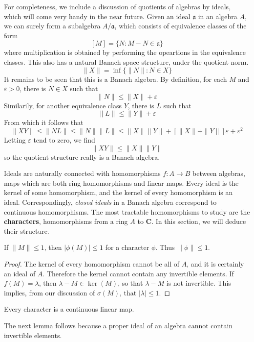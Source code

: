For completeness, we include a discussion of quotients of algebras by ideals, which will come very handy in the near future. Given an ideal $\mathfrak{a}$ in an algebra $A$, we can surely form a subalgebra $A/\mathfrak{a}$, which consists of equivalence classes of the form
%
\[ [M] = \{ N : M - N \in \mathfrak{a} \} \]
%
where multiplication is obtained by performing the opeartions in the equivalence classes. This also has a natural Banach space structure, under the quotient norm.
%
\[ \| X \| = \inf \{ \| N \| : N \in X \} \]
%
It remains to be seen that this is a Banach algebra. By definition, for each $M$ and $\varepsilon > 0$, there is $N \in X$ such that
%
\[ \| N \| \leq \| X \| + \varepsilon \]
%
Similarily, for another equivalence class $Y$, there is $L$ such that
%
\[ \| L \| \leq \| Y \| + \varepsilon \]
%
From which it follows that
%
\[ \| XY \| \leq \| NL \| \leq \| N \| \| L \| \leq \| X \| \| Y \| + [\| X \| + \| Y \|] \varepsilon + \varepsilon^2 \]
%
Letting $\varepsilon$ tend to zero, we find
%
\[ \| XY \| \leq \| X \| \| Y \| \]
%
so the quotient structure really is a Banach algebra.

Ideals are naturally connected with homomorphisms $f: A \to B$ between algebras, maps which are both ring homomorphisms and linear maps. Every ideal is the kernel of some homomorphism, and the kernel of every homomorphism is an ideal. Correspondingly, {\it closed ideals} in a Banach algebra correspond to continuous homomorphisms. The most tractable homomorphisms to study are the {\bf characters}, homomorphisms from a ring $A$ to $\mathbf{C}$. In this section, we will deduce their structure.

\begin{lemma}
    If $\| M \| \leq 1$, then $|\phi(M)| \leq 1$ for a character $\phi$. Thus $\| \phi \| \leq 1$.
\end{lemma}
\begin{proof}
    The kernel of every homomorphism cannot be all of $A$, and it is certainly an ideal of $A$. Therefore the kernel cannot contain any invertible elements. If $f(M) = \lambda$, then $\lambda - M \in \ker(M)$, so that $\lambda - M$ is not invertible. This implies, from our discussion of $\sigma(M)$, that $|\lambda| \leq 1$.
\end{proof}

\begin{corollary}
    Every character is a continuous linear map.
\end{corollary}

The next lemma follows because a proper ideal of an algebra cannot contain invertible elements.

